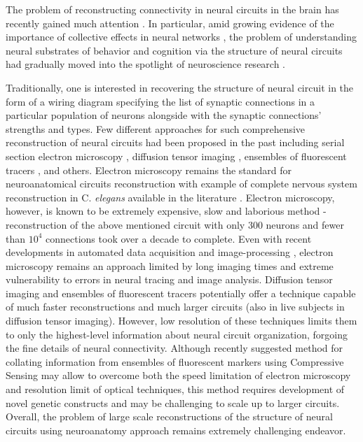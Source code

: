 The problem of reconstructing connectivity in neural circuits in the brain has recently gained much attention \cite{Hagmann2008, Hagmann2007, Helmstaedter2009, DenkHorstmann04, Briggman2006, Ikegaya2005}. In particular, amid growing evidence of the importance of collective effects in neural networks \cite{Rabinovich2008, Broome2006, Jones2007}, the problem of understanding neural substrates of behavior and cognition via the structure of neural circuits had gradually moved into the spotlight of neuroscience research \cite{Averbeck2008, deBono2005, Song2005, Dunn2004, Chalasani2007, Gray2005, rswormatlas, White1986}.

Traditionally, one is interested in recovering the structure of neural circuit in the form of a wiring diagram specifying the list of synaptic connections in a particular population of neurons alongside with the synaptic connections' strengths and types. Few different approaches for such comprehensive reconstruction of neural circuits had been proposed in the past including serial section electron microscopy \cite{Briggman2006, Helmstaedter2009}, diffusion tensor imaging \cite{Hagmann2007, Hagmann2008}, ensembles of fluorescent tracers \cite{Bohland2009}, and others. Electron microscopy remains the standard for neuroanatomical circuits reconstruction with example of complete nervous system reconstruction in C. {\em elegans} available in the literature \cite{White1986, rswormatlas}. Electron microscopy, however, is known to be extremely expensive, slow and laborious method - reconstruction of the above mentioned circuit with only 300 neurons and fewer than $10^4$ connections took over a decade to complete. Even with recent developments in automated data acquisition \cite{DenkHorstmann04} and image-processing \cite{Mishchenko2009c, Jain2007, Jurrus2006}, electron microscopy remains an approach limited by long imaging times and extreme vulnerability to errors in neural tracing and image analysis.
Diffusion tensor imaging \cite{Hagmann2007} and ensembles of fluorescent tracers \cite{Bohland2009} potentially offer a technique capable of much faster reconstructions and much larger circuits (also in live subjects in diffusion tensor imaging). However, low resolution of these techniques limits them to only the highest-level information about neural circuit organization, forgoing the fine details of neural connectivity.
Although recently suggested method for collating information from ensembles of fluorescent markers using Compressive Sensing \cite{Mishchenko2009a, Mishchenko2009} may allow to overcome both the speed limitation of electron microscopy and resolution limit of optical techniques, this method requires development of novel genetic constructs and may be challenging to scale up to larger circuits. Overall, the problem of large scale reconstructions of the structure of neural circuits using neuroanatomy approach remains extremely challenging endeavor.


